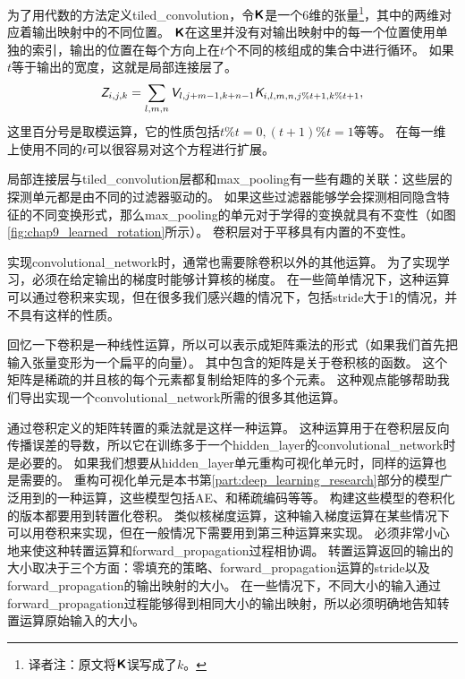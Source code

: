  
为了用代数的方法定义\gls{tiled_convolution}，令$\textsf{\textbf{K}}$是一个6维的张量\footnote{译者注：原文将$\textsf{\textbf{K}}$误写成了$k$。}，其中的两维对应着输出映射中的不同位置。%
$\textsf{\textbf{K}}$在这里并没有对输出映射中的每一个位置使用单独的索引，输出的位置在每个方向上在$t$个不同的核组成的集合中进行循环。
如果$t$等于输出的宽度，这就是局部连接层了。
\begin{equation}
\textit{\textsf{Z}}_{i, j, k} = \sum_{l, m, n} \textit{\textsf{V}}_{l, j+m-1, k+n-1} \textit{\textsf{K}}_{i, l, m, n, j\% t +1, k\% t+1},
\end{equation}
这里百分号是取模运算，它的性质包括$t\% t =0, (t+1)\% t = 1$等等。
在每一维上使用不同的$t$可以很容易对这个方程进行扩展。
 
  
 
局部连接层与\gls{tiled_convolution}层都和\gls{max_pooling}有一些有趣的关联：这些层的探测单元都是由不同的过滤器驱动的。
如果这些过滤器能够学会探测相同隐含特征的不同变换形式，那么\gls{max_pooling}的单元对于学得的变换就具有不变性（如图\ref{fig:chap9_learned_rotation}所示）。
卷积层对于平移具有内置的不变性。
 
 
实现\gls{convolutional_network}时，通常也需要除卷积以外的其他运算。
为了实现学习，必须在给定输出的梯度时能够计算核的梯度。
在一些简单情况下，这种运算可以通过卷积来实现，但在很多我们感兴趣的情况下，包括\gls{stride}大于1的情况，并不具有这样的性质。

回忆一下卷积是一种线性运算，所以可以表示成矩阵乘法的形式（如果我们首先把输入张量变形为一个扁平的向量）。
其中包含的矩阵是关于卷积核的函数。
这个矩阵是稀疏的并且核的每个元素都复制给矩阵的多个元素。
这种观点能够帮助我们导出实现一个\gls{convolutional_network}所需的很多其他运算。

通过卷积定义的矩阵转置的乘法就是这样一种运算。
这种运算用于在卷积层反向传播误差的导数，所以它在训练多于一个\gls{hidden_layer}的\gls{convolutional_network}时是必要的。
如果我们想要从\gls{hidden_layer}单元重构可视化单元时，同样的运算也是需要的\citep{Simard92-short}。
重构可视化单元是本书第\ref{part:deep_learning_research}部分的模型广泛用到的一种运算，这些模型包括\gls{AE}、和稀疏编码等等。
构建这些模型的卷积化的版本都要用到转置化卷积。
类似核梯度运算，这种输入梯度运算在某些情况下可以用卷积来实现，但在一般情况下需要用到第三种运算来实现。%
必须非常小心地来使这种转置运算和\gls{forward_propagation}过程相协调。
转置运算返回的输出的大小取决于三个方面：零填充的策略、\gls{forward_propagation}运算的\gls{stride}以及\gls{forward_propagation}的输出映射的大小。
在一些情况下，不同大小的输入通过\gls{forward_propagation}过程能够得到相同大小的输出映射，所以必须明确地告知转置运算原始输入的大小。

